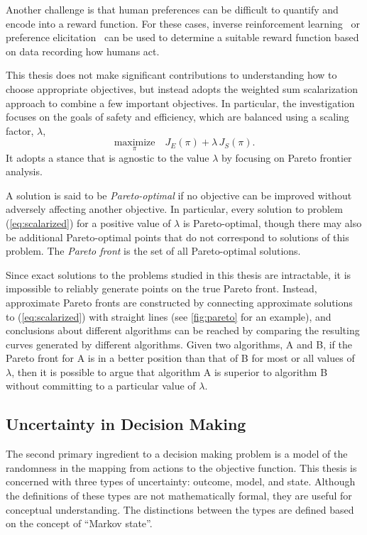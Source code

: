 Another challenge is that human preferences can be difficult to quantify and encode into a reward function.
For these cases, inverse reinforcement learning~\cite{levine2012continuous, sadigh2016leverage} or preference elicitation~\cite{lepird2015bayesian} can be used to determine a suitable reward function based on data recording how humans act.

This thesis does not make significant contributions to understanding how to choose appropriate objectives, but instead adopts the weighted sum scalarization approach to combine a few important objectives.
In particular, the investigation focuses on the goals of safety and efficiency, which are balanced using a scaling factor, $\lambda$,
\begin{equation} \label{eq:scalarized}
    \underset{\pi}{\text{maximize}} \quad J_E(\pi) + \lambda \, J_S(\pi) \text{.}
\end{equation}
It adopts a stance that is agnostic to the value $\lambda$ by focusing on Pareto frontier analysis.

A solution is said to be \emph{Pareto-optimal} if no objective can be improved without adversely affecting another objective.
In particular, every solution to problem (\ref{eq:scalarized}) for a positive value of $\lambda$ is Pareto-optimal, though there may also be additional Pareto-optimal points that do not correspond to solutions of this problem.
The \emph{Pareto front} is the set of all Pareto-optimal solutions.

Since exact solutions to the problems studied in this thesis are intractable, it is impossible to reliably generate points on the true Pareto front.
Instead, approximate Pareto fronts are constructed by connecting approximate solutions to (\ref{eq:scalarized}) with straight lines (see \cref{fig:pareto} for an example), and conclusions about different algorithms can be reached by comparing the resulting curves generated by different algorithms.
Given two algorithms, A and B, if the Pareto front for A is in a better position than that of B for most or all values of $\lambda$, then it is possible to argue that algorithm A is superior to algorithm B without committing to a particular value of $\lambda$.

\subsection{Uncertainty in Decision Making}

The second primary ingredient to a decision making problem is a model of the randomness in the mapping from actions to the objective function.
This thesis is concerned with three types of uncertainty: outcome, model, and state.
Although the definitions of these types are not mathematically formal, they are useful for conceptual understanding.
The distinctions between the types are defined based on the concept of ``Markov state''.

